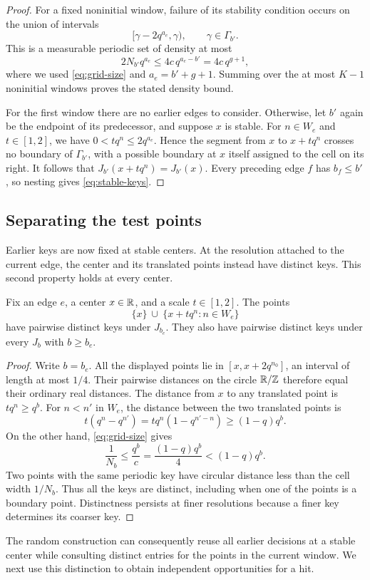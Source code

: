 \begin{proof}
For a fixed noninitial window, failure of its stability condition occurs
on the union of intervals
\[
 [\gamma-2q^{a_e},\gamma),\qquad \gamma\in\Gamma_{b'}.
\]
This is a measurable periodic set of density at most
\[
 2N_{b'}q^{a_e}
 \le4c\,q^{a_e-b'}
 =4c\,q^{g+1},
\]
where we used \eqref{eq:grid-size} and $a_e=b'+g+1$.  Summing over the
at most $K-1$ noninitial windows proves the stated density bound.

For the first window there are no earlier edges to consider.  Otherwise,
let $b'$ again be the endpoint of its predecessor, and suppose $x$ is
stable.  For $n\in W_e$ and $t\in[1,2]$, we have
$0<tq^n\le2q^{a_e}$.  Hence the segment from $x$ to $x+tq^n$ crosses
no boundary of $\Gamma_{b'}$, with a possible boundary at $x$ itself
assigned to the cell on its right.  It follows that
$J_{b'}(x+tq^n)=J_{b'}(x)$.  Every preceding edge $f$ has $b_f\le b'$,
so nesting gives \eqref{eq:stable-keys}.
\end{proof}

\subsection*{Separating the test points}

Earlier keys are now fixed at stable centers.  At the resolution attached
to the current edge, the center and its translated points instead have
distinct keys.  This second property holds at every center.

\begin{lemma}\label{lem:separation}
Fix an edge $e$, a center $x\in\mathbb R$, and a scale $t\in[1,2]$.  The points
\[
 \{x\}\ \cup\ \{x+tq^n:n\in W_e\}
\]
have pairwise distinct keys under $J_{b_e}$.  They also have pairwise
distinct keys under every $J_b$ with $b\ge b_e$.
\end{lemma}

\begin{proof}
Write $b=b_e$.  All the displayed points lie in
$[x,x+2q^{n_0}]$, an interval of length at most $1/4$.  Their pairwise
distances on the circle $\mathbb R/\mathbb Z$ therefore equal their ordinary real
distances.  The distance from $x$ to any translated point is
$tq^n\ge q^b$.  For $n<n'$ in $W_e$, the distance between the two
translated points is
\[
 t(q^n-q^{n'})=tq^n(1-q^{n'-n})\ge(1-q)q^b.
\]
On the other hand, \eqref{eq:grid-size} gives
\[
 \frac1{N_b}\le\frac{q^b}{c}
 =\frac{(1-q)q^b}{4}<(1-q)q^b.
\]
Two points with the same periodic key have circular distance less than
the cell width $1/N_b$.  Thus all the keys are distinct, including when
one of the points is a boundary point.  Distinctness persists at finer
resolutions because a finer key determines its coarser key.
\end{proof}

The random construction can consequently reuse all earlier decisions at
a stable center while consulting distinct entries for the points in the
current window.  We next use this distinction to obtain independent
opportunities for a hit.
